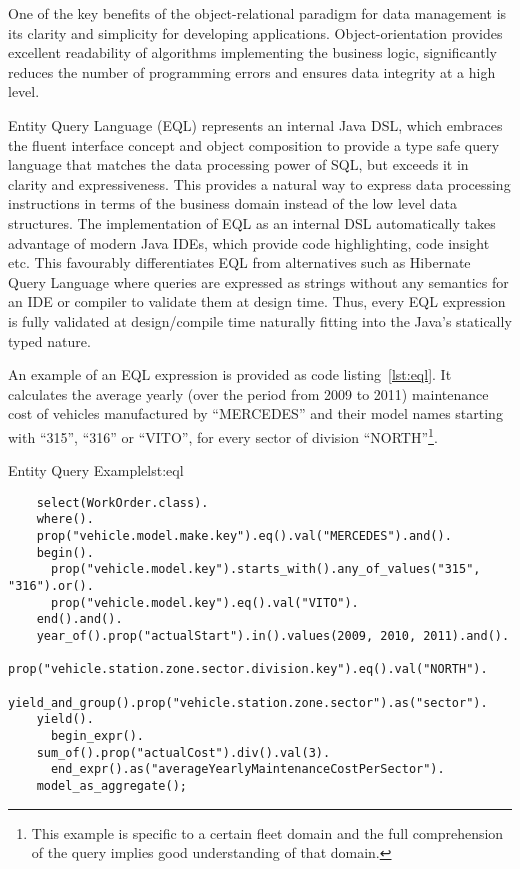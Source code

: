   One of the key benefits of the object-relational paradigm for data management is its clarity and simplicity for developing applications.
  Object-orientation provides excellent readability of algorithms implementing the business logic, significantly reduces the number of programming errors and ensures data integrity at a high level.
  
  Entity Query Language (EQL) represents an internal Java DSL, which embraces the fluent interface concept and object composition to provide a type safe query language that matches the data processing power of SQL, but exceeds it in clarity and expressiveness.
  This provides a natural way to express data processing instructions in terms of the business domain instead of the low level data structures.
  The implementation of EQL as an internal DSL automatically takes advantage of modern Java IDEs, which provide code highlighting, code insight etc.
  This favourably differentiates EQL from alternatives such as Hibernate Query Language where queries are expressed as strings without any semantics for an IDE or compiler to validate them at design time.
  Thus, every EQL expression is fully validated at design/compile time naturally fitting into the Java's statically typed nature.
  
  An example of an EQL expression is provided as code listing~\ref{lst:eql}.  
  It calculates the average yearly (over the period from 2009 to 2011) maintenance cost of vehicles manufactured by ``MERCEDES'' and their model names starting with ``315'', ``316'' or ``VITO'', for every sector of division ``NORTH''\footnote{This example is specific to a certain fleet domain and the full comprehension of the query implies good understanding of that domain.}.  

  \begin{code}{Entity Query Example}{lst:eql}
  \begin{lstlisting}
    select(WorkOrder.class).
    where().
    prop("vehicle.model.make.key").eq().val("MERCEDES").and().
    begin().
      prop("vehicle.model.key").starts_with().any_of_values("315", "316").or().
      prop("vehicle.model.key").eq().val("VITO").
    end().and().
    year_of().prop("actualStart").in().values(2009, 2010, 2011).and().
    prop("vehicle.station.zone.sector.division.key").eq().val("NORTH").
    yield_and_group().prop("vehicle.station.zone.sector").as("sector").
    yield().
      begin_expr().
	sum_of().prop("actualCost").div().val(3).
      end_expr().as("averageYearlyMaintenanceCostPerSector").
    model_as_aggregate();
  \end{lstlisting}
  \end{code}
  
